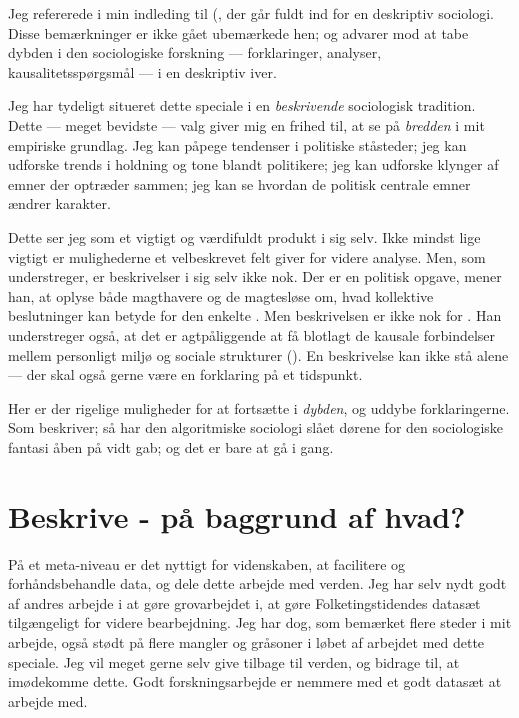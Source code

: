 Jeg refererede i min indleding til \citeauthor{savageContemporarySociologyChallenge2009} (\citeyear{savageContemporarySociologyChallenge2009}, der går fuldt ind for en deskriptiv sociologi.
Disse bemærkninger er ikke gået ubemærkede hen; og \citeauthor{ganeDescriptiveTurn2020} advarer mod at tabe dybden i den sociologiske forskning --- forklaringer, analyser, kausalitetsspørgsmål --- i en deskriptiv iver.

Jeg har tydeligt situeret dette speciale i en \textit{beskrivende} sociologisk tradition.
Dette — meget bevidste — valg giver mig en frihed til,
at se på \textit{bredden} i mit empiriske grundlag.
Jeg kan påpege tendenser i politiske ståsteder;
jeg kan udforske trends i holdning og tone blandt politikere;
jeg kan udforske klynger af emner der optræder sammen;
jeg kan se hvordan de politisk centrale emner ændrer karakter.

Dette ser jeg som et vigtigt og værdifuldt produkt i sig selv.
Ikke mindst lige vigtigt er mulighederne et velbeskrevet felt giver for videre analyse.
Men, som \citeauthor{millsSociologicalImagination2000} understreger, er beskrivelser i sig selv ikke nok.
Der er en politisk opgave, mener han, at oplyse både magthavere og de magtesløse om, hvad kollektive beslutninger kan betyde for den enkelte \autocite[s. 185]{millsSociologicalImagination2000}.
Men beskrivelsen er ikke nok for \citeauthor{millsSociologicalImagination2000}.
Han understreger også, at det er agtpåliggende at få blotlagt de kausale forbindelser mellem personligt miljø og sociale strukturer (\citeyear[s. 130]{millsSociologicalImagination2000}).
En beskrivelse kan ikke stå alene — der skal også gerne være en forklaring på et tidspunkt.

Her er der rigelige muligheder for at fortsætte i \textit{dybden}, og uddybe forklaringerne.
Som \citeauthor{evansComputationSociologicalImagination2019} beskriver; så har den algoritmiske sociologi slået dørene for den sociologiske fantasi åben på vidt gab; og det er bare at gå i gang.

\section{Beskrive - på baggrund af hvad?}

På et meta-niveau er det nyttigt for videnskaben,
at facilitere og forhåndsbehandle data,
og dele dette arbejde med verden.
Jeg har selv nydt godt af andres arbejde i at gøre grovarbejdet i,
at gøre Folketingstidendes datasæt tilgængeligt for videre bearbejdning.
Jeg har dog, som bemærket flere steder i mit arbejde, 
også stødt på flere mangler og gråsoner i løbet af arbejdet med dette speciale.
Jeg vil meget gerne selv give tilbage til verden, og bidrage til, at imødekomme dette.
Godt forskningsarbejde er nemmere med et godt datasæt at arbejde med.


